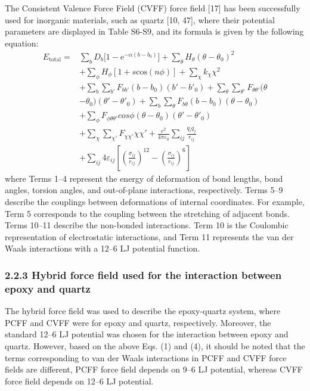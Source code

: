 \documentclass{article}
\begin{document}
The Consistent Valence Force Field (CVFF) force field [17] has been successfully used for inorganic materials, such as quartz [10, 47], where their potential parameters are displayed in Table S6-S9, and its formula is given by the following equation:
\begin{equation*}
\begin{aligned}
E_{\mathrm{total}} ={}& \sum_b D_b\Big[1-\mathrm{e}^{-\alpha(b-b_0)}\Big]+\sum_\theta H_\theta(\theta-\theta_0)^2\\
&+\sum_\phi H_\phi[1+s\mathrm{cos}(n\phi)]+\sum_\chi k_\chi\chi^2\\
&+\sum_b\sum_{b'}F_{bb'}(b-b_0)(b'-b'_0)+\sum_\theta\sum_{\theta'}F_{\theta\theta'}(\theta\\
&-\theta_0)(\theta'-\theta'_0)+\sum_b\sum_\theta F_{b\theta}(b-b_0)(\theta-\theta_0)\\
&+\sum_\phi F_{\phi\theta\theta'}\mathit{cos}\phi(\theta-\theta_0)(\theta'-\theta'_0)\\
&+\sum_\chi\sum_{\chi'}F_{\chi\chi'}\chi\chi'+\frac{e^2}{4\pi\varepsilon_0}\sum_{ij}\frac{q_iq_j}{r_{ij}}\\
&+\sum_{ij}4\varepsilon_{ij}\left[\left(\frac{\sigma_{ij}}{r_{ij}}\right)^{12}-\left(\frac{\sigma_{ij}}{r_{ij}}\right)^6\right]
\end{aligned}\tag{4}
\end{equation*}
where Terms 1–4 represent the energy of deformation of bond lengths, bond angles, torsion angles, and out-of-plane interactions, respectively. Terms 5–9 describe the couplings between deformations of internal coordinates. For example, Term 5 corresponds to the coupling between the stretching of adjacent bonds. Terms 10–11 describe the non-bonded interactions. Term 10 is the Coulombic representation of electrostatic interactions, and Term 11 represents the van der Waals interactions with a 12–6 LJ potential function.

\subsubsection*{2.2.3 Hybrid force field used for the interaction between epoxy and quartz}

The hybrid force field was used to describe the epoxy-quartz system, where PCFF and CVFF were for epoxy and quartz, respectively. Moreover, the standard 12–6 LJ potential was chosen for the interaction between epoxy and quartz. However, based on the above Eqs. (1) and (4), it should be noted that the terms corresponding to van der Waals interactions in PCFF and CVFF force fields are different, PCFF force field depends on 9–6 LJ potential, whereas CVFF force field depends on 12–6 LJ potential.
\end{document}
